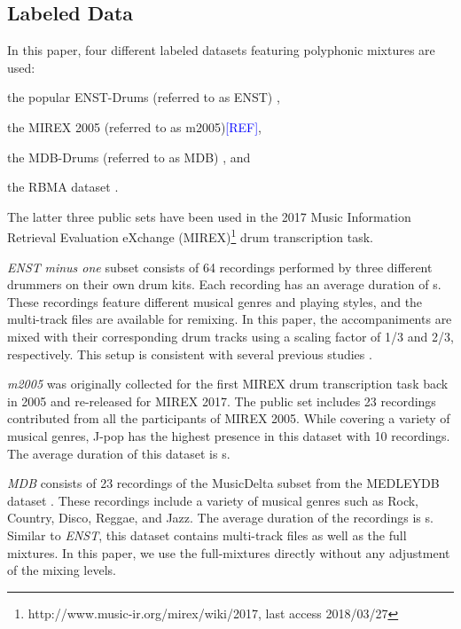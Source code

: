 \documentclass{article}
\newcommand{\comment}[1]{{\textcolor{blue}{#1}}}
\begin{document}
\subsection{Labeled Data}
In this paper, four different labeled datasets featuring polyphonic mixtures are used:
\begin{inparaenum}[(i)]
    \item   the popular ENST-Drums (referred to as ENST) \cite{Gillet2006_enst},
    \item   the MIREX 2005 (referred to as m2005)\comment{[REF]},
    \item   the MDB-Drums (referred to as MDB) \cite{Southall2017_mdb}, and
    \item   the RBMA dataset \cite{Vogl2017_ismir}.
\end{inparaenum}
The latter three public sets have been used in the 2017 Music Information Retrieval Evaluation eXchange (MIREX)\footnote{http://www.music-ir.org/mirex/wiki/2017, last access 2018/03/27} drum transcription task. 

\textit{ENST} \textit{minus one} subset consists of 64 recordings performed by three different drummers on their own drum kits. Each recording has an average duration of \unit[55]{s}. These recordings feature different musical genres and playing styles, and the multi-track files are available for remixing. In this paper, the accompaniments are mixed with their corresponding drum tracks using a scaling factor of 1/3 and 2/3, respectively. This setup is consistent with several previous studies \cite{Wu2015_ismir, Vogl2016, Southall2016}. 

\textit{m2005} was originally collected for the first MIREX drum transcription task back in 2005 and re-released for MIREX 2017. The public set includes 23 recordings contributed from all the participants of MIREX 2005. While covering a variety of musical genres, J-pop has the highest presence in this dataset with 10 recordings. The average duration of this dataset is \unit[125]{s}. 

\textit{MDB} consists of 23 recordings of the MusicDelta subset from the MEDLEYDB dataset \cite{Bittner2014a}. These recordings include a variety of musical genres such as Rock, Country, Disco, Reggae, and Jazz. The average duration of the recordings is \unit[54]{s}. Similar to \textit{ENST}, this dataset contains multi-track files as well as the full mixtures. In this paper, we use the full-mixtures directly without any adjustment of the mixing levels. 
\end{document}
